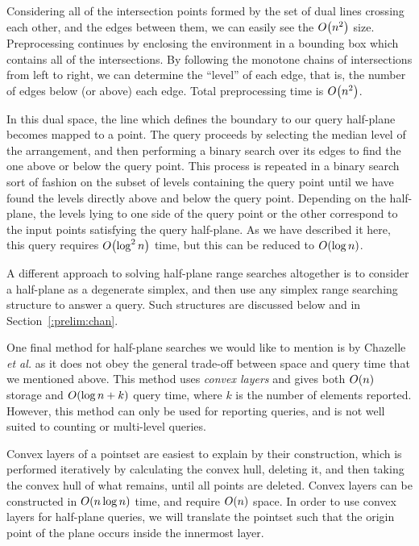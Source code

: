 Considering all of the intersection points formed by the set of dual lines crossing each other, and the edges between them, we can easily see the $O\!\left(n^2\right)$ size.
Preprocessing continues by enclosing the environment in a bounding box which contains all of the intersections.
By following the monotone chains of intersections from left to right, we can determine the ``level'' of each edge, that is, the number of edges below (or above) each edge.
Total preprocessing time is $O\!\left(n^2\right)$.

In this dual space, the line which defines the boundary to our query half-plane becomes mapped to a point.
The query proceeds by selecting the median level of the arrangement, and then performing a binary search over its edges to find the one above or below the query point.
This process is repeated in a binary search sort of fashion on the subset of levels containing the query point until we have found the levels directly above and below the query point. 
Depending on the half-plane, the levels lying to one side of the query point or the other correspond to the input points satisfying the query half-plane.
As we have described it here, this query requires $O\!\left(\log^2{n}\right)$ time, but this can be reduced to $O\!\left(\log{n}\right)$.\cite{NandyDG03}

A different approach to solving half-plane range searches altogether is to consider a half-plane as a degenerate simplex, and then use any simplex range searching structure to answer a query.  
Such structures are discussed below and in Section~\ref{:prelim:chan}.

One final method for half-plane searches we would like to mention is by Chazelle \emph{et al.}\cite{ChazelleGL85,Chazelle85} as it does not obey the general trade-off between space and query time that we mentioned above.
This method uses \emph{convex layers} and gives both $O\!\left(n\right)$ storage and $O\!\left(\log{n} + k\right)$ query time, where $k$ is the number of elements reported. 
However, this method can only be used for reporting queries, and is not well suited to counting or multi-level queries.

Convex layers of a pointset are easiest to explain by their construction, which is performed iteratively by calculating the convex hull, deleting it, and then taking the convex hull of what remains, until all points are deleted.
Convex layers can be constructed in $O\!\left(n\log{n}\right)$ time, and require $O\!\left(n\right)$ space.
In order to use convex layers for half-plane queries, we will translate the pointset such that the origin point of the plane occurs inside the innermost layer.

